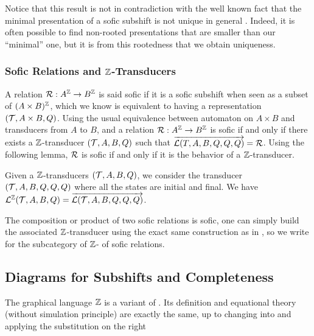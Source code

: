 Notice that this result is not in contradiction with the well known fact that the minimal presentation of a sofic subshift is not unique in general \cite{lind-marcus}. Indeed, it is often possible to find non-rooted presentations that are smaller than our ``minimal'' one, but it is from this rootedness that we obtain uniqueness.

\subsubsection{Sofic Relations and ${\mathbb{Z}}$-Transducers}\label{sec:sofic-z-transducer}

A relation ${\mathcal{R}} : A^{\mathbb{Z}} \to B^{\mathbb{Z}}$ is said sofic if it is a sofic subshift when seen as a subset of $(A\times B)^{\mathbb{Z}}$, which we know is equivalent to having a representation $({\mathcal{T}},A \times B,Q)$. Using the usual equivalence between automaton on $A \times B$ and transducers from $A$ to $B$, and a relation  ${\mathcal{R}} : A^{\mathbb{Z}} \to B^{\mathbb{Z}}$ is sofic if and only if there exists a ${\mathbb{Z}}$-transducer $({\mathcal{T}},A,B,Q)$ such that $\overrightarrow{{\mathcal{L}}(T,A,B,Q,Q,Q)} = {\mathcal{R}}$. Using the following lemma, ${\mathcal{R}}$ is sofic if and only if it is the behavior of a ${\mathbb{Z}}$-transducer.

\begin{lemma}\label{lem:zeta-transducer-from-transducer}
	Given a ${\mathbb{Z}}$-transducers $({\mathcal{T}},A,B,Q)$, we consider the transducer  $({\mathcal{T}},A,B,Q,Q,Q)$ where all the states are initial and final.
        We have ${\mathcal{L}}^{\mathbb{Z}}({\mathcal{T}},A,B,Q) = \overrightarrow{{\mathcal{L}}({\mathcal{T}},A,B,Q,Q,Q)}$.
\end{lemma}

The composition or product of two sofic relations is sofic, one can simply build the associated ${\mathbb{Z}}$-transducer using the exact same construction as in , so we write  for the subcategory of ${\mathbb{Z}}$- of sofic relations.

\subsection{Diagrams for Subshifts and Completeness}\label{sec:diag-shift}

\begin{wrapfigure}{r}{0.35\textwidth}\vspace{-0.2cm}
\end{wrapfigure}
The graphical language ${\mathbb{Z}}$ is a variant of . 
Its definition and equational theory (without simulation principle) are exactly the same, up to changing  into  and applying the substitution on the right 

